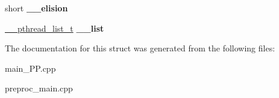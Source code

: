 \begin{DoxyCompactItemize}
\item 
\hypertarget{structpthread__mutex__t_1_1____pthread__mutex__s_af7ef49aaa0421febf2b281205acf5c19}{short {\bfseries \+\_\+\+\_\+elision}}\label{structpthread__mutex__t_1_1____pthread__mutex__s_af7ef49aaa0421febf2b281205acf5c19}

\item 
\hypertarget{structpthread__mutex__t_1_1____pthread__mutex__s_aae6b02c57684242df9b487a00a111a32}{\hyperlink{struct____pthread__internal__list}{\+\_\+\+\_\+pthread\+\_\+list\+\_\+t} {\bfseries \+\_\+\+\_\+list}}\label{structpthread__mutex__t_1_1____pthread__mutex__s_aae6b02c57684242df9b487a00a111a32}

\end{DoxyCompactItemize}


The documentation for this struct was generated from the following files\+:\begin{DoxyCompactItemize}
\item 
main\+\_\+\+P\+P.\+cpp\item 
preproc\+\_\+main.\+cpp\end{DoxyCompactItemize}
